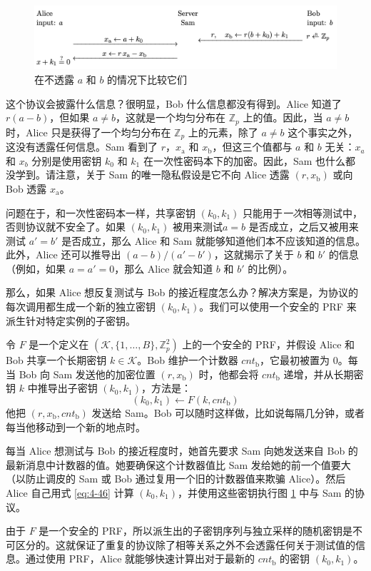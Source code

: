 \begin{figure}
  \centering
  \includegraphics[width=0.88\linewidth]{figures/chapter4/fig17.png}
  \caption{在不透露 $a$ 和 $b$ 的情况下比较它们}
  \label{fig:4-17}
\end{figure}

这个协议会披露什么信息？很明显，Bob 什么信息都没有得到。Alice 知道了 $r(a-b)$，但如果 $a\neq b$，这就是一个均匀分布在 $\mathbb{Z}_p$ 上的值。因此，当 $a\neq b$时，Alice 只是获得了一个均匀分布在 $\mathbb{Z}_p$ 上的元素，除了 $a\neq b$ 这个事实之外，这没有透露任何信息。Sam 看到了 $r$，$x_\mathrm{a}$ 和 $x_\mathrm{b}$，但这三个值都与 $a$ 和 $b$ 无关：$x_a$ 和 $x_b$ 分别是使用密钥 $k_0$ 和 $k_1$ 在一次性密码本下的加密。因此，Sam 也什么都没学到。请注意，关于 Sam 的唯一隐私假设是它不向 Alice 透露 $(r,x_\mathrm{b})$ 或向 Bob 透露 $x_\mathrm{a}$。

\vspace{8pt}

问题在于，和一次性密码本一样，共享密钥 $(k_0,k_1)$ 只能用于\emph{一次}相等测试中，否则协议就不安全了。如果 $(k_0,k_1)$ 被用来测试$a=b$ 是否成立，之后又被用来测试 $a'=b'$ 是否成立，那么 Alice 和 Sam 就能够知道他们本不应该知道的信息。此外，Alice 还可以推导出 $(a-b)/(a'-b')$，这就揭示了关于 $b$ 和 $b'$ 的信息（例如，如果 $a=a'=0$，那么 Alice 就会知道 $b$ 和 $b'$ 的比例）。

\begin{snote}[子密钥的派生。]
那么，如果 Alice 想反复测试与 Bob 的接近程度怎么办？解决方案是，为协议的每次调用都生成一个新的独立密钥 $(k_0,k_1)$。我们可以使用一个安全的 PRF 来派生针对特定实例的子密钥。

令 $F$ 是一个定义在 $(\mathcal{K},\{1,\dots,B\},\mathbb{Z}^2_p)$ 上的一个安全的 PRF，并假设 Alice 和 Bob 共享一个长期密钥 $k\in\mathcal{K}$。Bob 维护一个计数器 $cnt_\mathrm{b}$，它最初被置为 $0$。每当 Bob 向 Sam 发送他的加密位置 $(r,x_\mathrm{b})$ 时，他都会将 $cnt_\mathrm{b}$ 递增，并从长期密钥 $k$ 中推导出子密钥 $(k_0,k_1)$，方法是：
\begin{equation}\label{eq:4-46}
(k_0,k_1)\leftarrow F(k,cnt_\mathrm{b})
\end{equation}
他把 $(r,x_\mathrm{b},cnt_\mathrm{b})$ 发送给 Sam。Bob 可以随时这样做，比如说每隔几分钟，或者每当他移动到一个新的地点时。

每当 Alice 想测试与 Bob 的接近程度时，她首先要求 Sam 向她发送来自 Bob 的最新消息中计数器的值。她要确保这个计数器值比 Sam 发给她的前一个值要大（以防止调皮的 Sam 或 Bob 通过复用一个旧的计数器值来欺骗 Alice）。然后 Alice 自己用式 \ref{eq:4-46} 计算 $(k_0,k_1)$，并使用这些密钥执行图 \ref{fig:4-17} 中与 Sam 的协议。

由于 $F$ 是一个安全的 PRF，所以派生出的子密钥序列与独立采样的随机密钥是不可区分的。这就保证了重复的协议除了相等关系之外不会透露任何关于测试值的信息。通过使用 PRF，Alice 就能够快速计算出对于最新的 $cnt_\mathrm{b}$ 的密钥 $(k_0,k_1)$。
\end{snote}